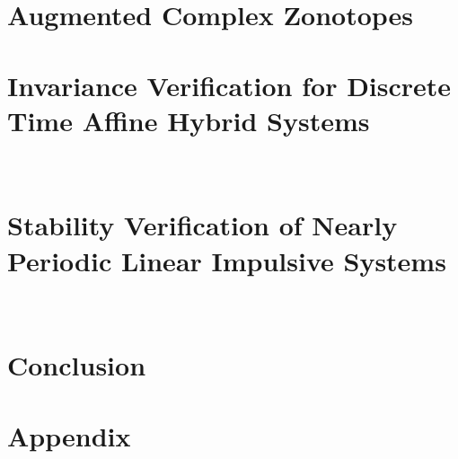 \documentclass[11pt,a4paper,twoside,openright]{book}
\begin{document}
\chapter{Augmented Complex Zonotopes} \label{ch:acz} 
%
\chapter{Invariance Verification for Discrete Time Affine Hybrid Systems} ~\label{ch:invariance} 
%
\chapter{Stability Verification of Nearly Periodic Linear Impulsive Systems} ~\label{ch:lis} 
%
\chapter{Conclusion} \label{sec:concl} 
%  


\appendix
\chapter{Appendix} 

{}




\end{document}

